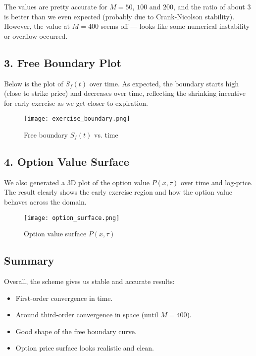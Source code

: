 \documentclass{article}
\begin{document}
\noindent The values are pretty accurate for $M=50$, $100$ and $200$, and the ratio of about 3 is better than we even expected (probably due to Crank-Nicolson stability). However, the value at $M=400$ seems off — looks like some numerical instability or overflow occurred.

\subsection*{3. Free Boundary Plot}

Below is the plot of $S_f(t)$ over time. As expected, the boundary starts high (close to strike price) and decreases over time, reflecting the shrinking incentive for early exercise as we get closer to expiration.

\begin{figure}[h]
\centering
\texttt{[image: exercise\_boundary.png]}
\caption{Free boundary $S_f(t)$ vs. time}
\end{figure}

\subsection*{4. Option Value Surface}

We also generated a 3D plot of the option value $P(x,\tau)$ over time and log-price. The result clearly shows the early exercise region and how the option value behaves across the domain.

\begin{figure}[h]
\centering
\texttt{[image: option\_surface.png]}
\caption{Option value surface $P(x, \tau)$}
\end{figure}

\subsection*{Summary}

Overall, the scheme gives us stable and accurate results:
\begin{itemize}
    \item First-order convergence in time.
    \item Around third-order convergence in space (until $M=400$).
    \item Good shape of the free boundary curve.
    \item Option price surface looks realistic and clean.
\end{itemize}
\end{document}
